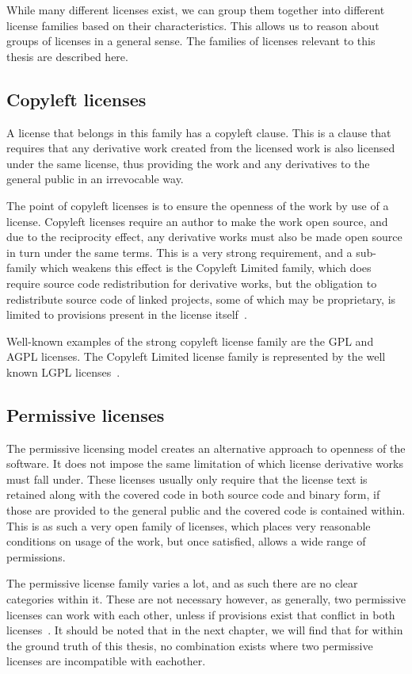 While many different licenses exist, we can group them together into different license families based on their characteristics. This allows us to reason about groups of licenses in a general sense. The families of licenses relevant to this thesis are described here.

\subsection{Copyleft licenses}

A license that belongs in this family has a copyleft clause. This is a clause that requires that any derivative work created from the licensed work is also licensed under the same license, thus providing the work and any derivatives to the general public in an irrevocable way.

The point of copyleft licenses is to ensure the openness of the work by use of a license. Copyleft licenses require an author to make the work open source, and due to the reciprocity effect, any derivative works must also be made open source in turn under the same terms. This is a very strong requirement, and a sub-family which weakens this effect is the Copyleft Limited family, which does require source code redistribution for derivative works, but the obligation to redistribute source code of linked projects, some of which may be proprietary, is limited to provisions present in the license itself~\cite{scancode-licensedb,license-integration-patterns-1,license-integration-patterns-2}.

Well-known examples of the strong copyleft license family are the GPL and AGPL licenses. The Copyleft Limited license family is represented by the well known LGPL licenses~\cite{scancode-licensedb}.

\subsection{Permissive licenses}

The permissive licensing model creates an alternative approach to openness of the software. It does not impose the same limitation of which license derivative works must fall under. These licenses usually only require that the license text is retained along with the covered code in both source code and binary form, if those are provided to the general public and the covered code is contained within. This is as such a very open family of licenses, which places very reasonable conditions on usage of the work, but once satisfied, allows a wide range of permissions.

The permissive license family varies a lot, and as such there are no clear categories within it. These are not necessary however, as generally, two permissive licenses can work with each other, unless if provisions exist that conflict in both licenses~\cite{license-integration-patterns-1,license-integration-patterns-2}. It should be noted that in the next chapter, we will find that for within the ground truth of this thesis, no combination exists where two permissive licenses are incompatible with eachother.
